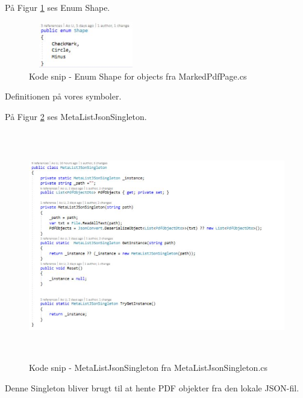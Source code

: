 \clearpage

På Figur \ref{fig:Enum} ses Enum Shape.
\begin{figure}[H] %
	\centering
	\includegraphics[height=2cm, width=5cm]{../ArkitekturDesign/Design/RegisterPDF/Enum}
	\caption{Kode snip - Enum Shape for objects fra MarkedPdfPage.cs}
	\label{fig:Enum}
\end{figure}
Definitionen på vores symboler.

På Figur \ref{fig:Singleton} ses MetaListJsonSingleton.
\begin{figure}[H] %
	\centering
	\includegraphics[height=10cm, width=14cm]{../ArkitekturDesign/Design/RegisterPDF/Singleton}
	\caption{Kode snip - MetaListJsonSingleton fra MetaListJsonSingleton.cs }
	\label{fig:Singleton}
\end{figure}
Denne Singleton bliver brugt til at hente PDF objekter fra den lokale JSON-fil.

\clearpage

